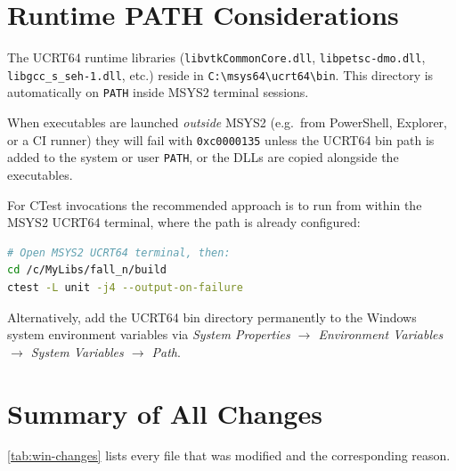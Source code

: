 \section{Runtime PATH Considerations}
\label{sec:win-runtime-path}

The UCRT64 runtime libraries (\texttt{libvtkCommonCore.dll},
\texttt{libpetsc-dmo.dll}, \texttt{libgcc\_s\_seh-1.dll}, etc.) reside in
\texttt{C:\textbackslash msys64\textbackslash ucrt64\textbackslash bin}.  This
directory is automatically on \texttt{PATH} inside MSYS2 terminal sessions.

When executables are launched \emph{outside} MSYS2 (e.g.\ from PowerShell,
Explorer, or a CI runner) they will fail with \texttt{0xc0000135} unless the
UCRT64 bin path is added to the system or user \texttt{PATH}, or the DLLs are
copied alongside the executables.

For CTest invocations the recommended approach is to run from within the MSYS2
UCRT64 terminal, where the path is already configured:
\begin{lstlisting}[language=bash, basicstyle=\ttfamily\small,
    keywordstyle=\bfseries\color{blue!70!black},
    commentstyle=\itshape\color{green!50!black},
    stringstyle=\color{red!60!black},
    frame=single, framerule=0.4pt, rulecolor=\color{gray!50},
    breaklines=true, showstringspaces=false]
# Open MSYS2 UCRT64 terminal, then:
cd /c/MyLibs/fall_n/build
ctest -L unit -j4 --output-on-failure
\end{lstlisting}

Alternatively, add the UCRT64 bin directory permanently to the Windows system
environment variables via \textit{System Properties $\to$ Environment Variables
$\to$ System Variables $\to$ Path}.

\section{Summary of All Changes}
\label{sec:win-summary}

\autoref{tab:win-changes} lists every file that was modified and the
corresponding reason.

